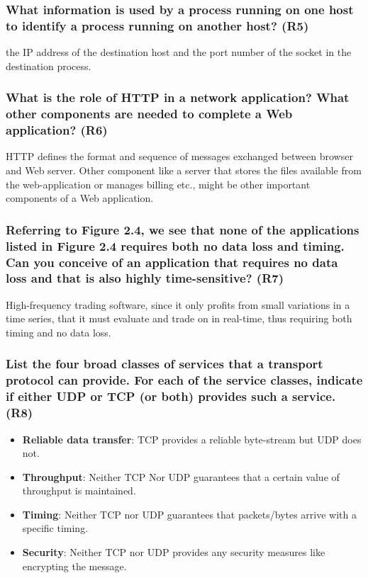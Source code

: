 \subsubsection{What information is used by a process running on one host to identify a process running on another host? (R5)}
the IP address of the destination host and the port number of the socket in the destination process.


\subsubsection{What is the role of HTTP in a network application? What other components are needed to complete a Web application? (R6)}
HTTP defines the format and sequence of messages exchanged between browser and Web server. Other component like a server that stores the files available from the web-application or manages billing etc., might be other important components of a Web application.


\subsubsection{Referring to Figure 2.4, we see that none of the applications listed in Figure 2.4 requires both no data loss and timing. Can you conceive of an application that requires no data loss and that is also highly time-sensitive? (R7)}
High-frequency trading software, since it only profits from small variations in a time series, that it must evaluate and trade on in real-time, thus requiring both timing and no data loss.


\subsubsection{List the four broad classes of services that a transport protocol can provide. For each of the service classes, indicate if either UDP or TCP (or both) provides such a service. (R8)}

\begin{itemize}
    \item \textbf{Reliable data transfer}: TCP provides a reliable byte-stream but UDP does not.
    \item \textbf{Throughput}: Neither TCP Nor UDP guarantees that a certain value of throughput is maintained.
    \item \textbf{Timing}: Neither TCP nor UDP guarantees that packets/bytes arrive with a specific timing.
    \item \textbf{Security}: Neither TCP nor UDP provides any security measures like encrypting the message.
\end{itemize}

